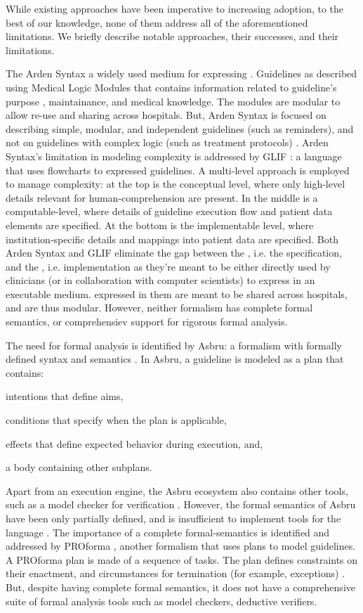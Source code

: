 While existing approaches have been imperative to increasing \CGS{} adoption, to the
best of our knowledge, none of them address all of the aforementioned
limitations. We briefly describe notable approaches, their successes, and their limitations.

The Arden Syntax \cite{HripcsakCBM94} a widely used medium for
expressing \CIGs{}.  Guidelines as described using Medical
Logic Modules that contains information related to guideline's purpose
, maintainance, and medical knowledge. The modules are modular to allow
re-use and sharing across hospitals. But, Arden Syntax
is focused on describing simple, modular, and independent
guidelines (such as reminders), and not on guidelines with complex logic (such
as treatment protocols) \cite{PelegJBI01}.
Arden Syntax's limitation in modeling complexity is addressed by
GLIF \cite{BoxwalaJBI04}: a language that uses flowcharts to expressed
guidelines. A multi-level approach is
employed to manage complexity: at the top is the conceptual level, where
only high-level details relevant for human-comprehension are present. In the
middle is a computable-level, where details of guideline execution flow
and patient data elements are specified. At the bottom is the implementable
level, where institution-specific details and mappings into patient data are
specified. Both Arden Syntax and GLIF  eliminate
the gap between the \BPG{}, i.e. the specification, and the \CIG{}, i.e. implementation as
they're meant to be either directly used by clinicians (or in collaboration with
computer scientists) to express \BPGs{} in an executable medium. \CIGs{}
expressed in them are meant to be shared across hospitals, and are thus modular.
However, neither formalism has complete formal semantics, or comprehensiev support for
rigorous formal analysis.

The need for formal analysis is identified by Asbru: a formalism with formally
defined syntax and semantics \cite{ShaharAMIA96}. In Asbru, a guideline is modeled as a plan
that contains:
\begin{enumerate*}[label=(\roman*)]
  \item intentions that define aims,
  \item conditions that specify when the plan is applicable,
  \item effects that define expected behavior during execution, and,
  \item a body containing other subplans.
\end{enumerate*}
Apart from an execution engine, the Asbru ecosystem also contains
other tools, such as a model checker for verification \cite{BaumlerSPIN06}.
However, the formal semantics of Asbru have been only partially defined, and
is insufficient to implement tools for the language \cite{SuttonAMIA03}.
The importance of a complete formal-semantics is identified and addressed
by PROforma \cite{SuttonAMIA03}, another formalism that uses plans to
model guidelines. A PROforma plan is made of a sequence of tasks.
The plan defines constraints on their enactment, and circumstances
for termination (for example, exceptions) \cite{SuttonAMIA03}. But, despite
having complete formal semantics, it does not have a comprehensive suite of
formal analysis tools such as model checkers, deductive verifiers.


